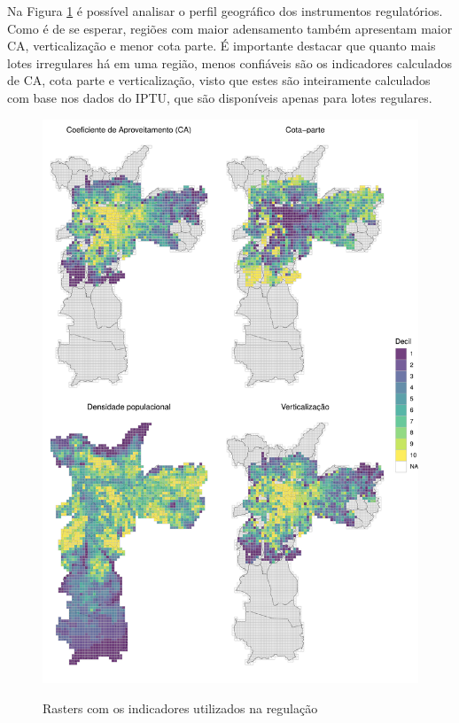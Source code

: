 Na Figura \ref{fig:rasters} é possível analisar o perfil geográfico dos instrumentos regulatórios. Como é de se esperar, regiões com maior adensamento também apresentam maior CA, verticalização e menor cota parte. É importante destacar que quanto mais lotes irregulares há em uma região, menos confiáveis são os indicadores calculados de CA, cota parte e verticalização, visto que estes são inteiramente calculados com base nos dados do IPTU, que são disponíveis apenas para lotes regulares.

\begin{figure}[h]
    \centering
    \caption{Rasters com os indicadores utilizados na regulação}
    \includegraphics[width = .99\linewidth]{imagens/rasters.pdf}
    \label{fig:rasters}
\end{figure}

